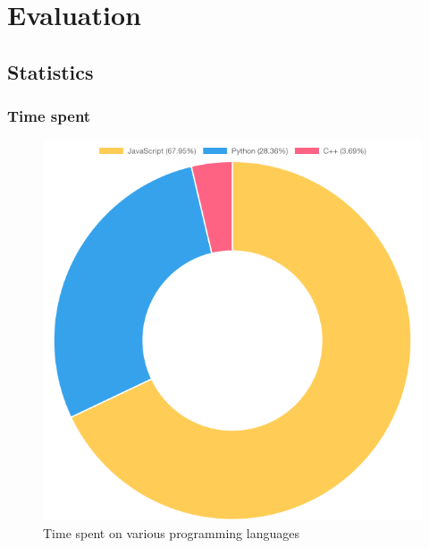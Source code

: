 \chapter{Evaluation}
\label{ch:evaluation}


\section{Statistics}
\label{sec:statistics}

\subsection{Time spent}

\begin{figure}[h]
\centering
\includegraphics[scale=0.5]{04_Artefakte/01_Abbildungen/time-spent-on-languages}
\caption[Time spent on languages]{Time spent on various programming languages\protect}
\label{fig:timeSpentLanguages}
\end{figure}

